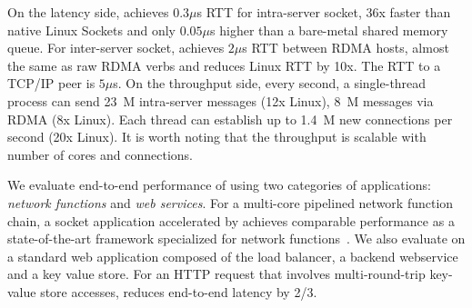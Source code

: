 On the latency side, \sys{} achieves $0.3\mu$s RTT for intra-server socket, 36x faster than native Linux Sockets and only $0.05\mu$s higher than a bare-metal shared memory queue. For inter-server socket, \sys{} achieves $2\mu$s RTT between RDMA hosts, almost the same as raw RDMA verbs and reduces Linux RTT by 10x. The RTT to a TCP/IP peer is $5\mu$s. On the throughput side, every second, a single-thread process can send 23~M intra-server messages (12x Linux), 8~M messages via RDMA (8x Linux).
Each thread can establish up to 1.4~M new connections per second (20x Linux). It is worth noting that the throughput is scalable with number of cores and connections.

We evaluate end-to-end performance of \sys{} using two categories of applications: \textit{network functions} and \textit{web services}. For a multi-core pipelined network function chain, a socket application accelerated by \sys{} achieves comparable performance as a state-of-the-art framework specialized for network functions~\cite{panda2016netbricks}. We also evaluate \sys{} on a standard web application composed of the load balancer, a backend webservice and a key value store. %
For an HTTP request that involves multi-round-trip key-value store accesses, \sys{} reduces end-to-end latency by 2/3. 
